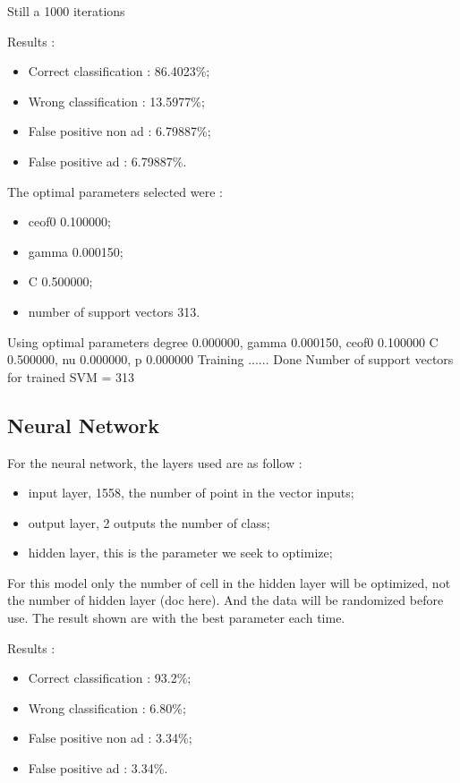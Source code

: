Still a 1000 iterations

Results :
\begin{itemize}
  \item Correct classification : 86.4023\%;
  \item Wrong classification : 13.5977\%;
  \item False positive non ad : 6.79887\%;
  \item False positive ad : 6.79887\%.
\end{itemize}

The optimal parameters selected were :
\begin{itemize}
  \item ceof0 0.100000;
  \item gamma 0.000150;
  \item C 0.500000;
  \item number of support vectors 313.
\end{itemize}
Using optimal parameters degree 0.000000, gamma 0.000150, ceof0 0.100000
	 C 0.500000, nu 0.000000, p 0.000000
 Training ...... Done
Number of support vectors for trained SVM = 313


\subsection{Neural Network}

For the neural network, the layers used are as follow :
  \begin{itemize}
    \item input layer, 1558, the number of point in the vector inputs;
    \item output layer, 2 outputs the number of class;
    \item hidden layer, this is the parameter we seek to optimize;
  \end{itemize}

 For this model only the number of cell in the hidden layer will be optimized, not the number of hidden layer (doc here). And the data will be randomized before use. The result shown are with the best parameter each time.

  Results :
  \begin{itemize}
    \item Correct classification : 93.2\%;
    \item Wrong classification : 6.80\%;
    \item False positive non ad : 3.34\%;
    \item False positive ad : 3.34\%.
  \end{itemize}


